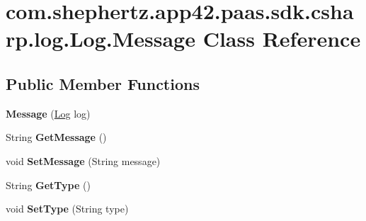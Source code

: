 \hypertarget{classcom_1_1shephertz_1_1app42_1_1paas_1_1sdk_1_1csharp_1_1log_1_1_log_1_1_message}{\section{com.\+shephertz.\+app42.\+paas.\+sdk.\+csharp.\+log.\+Log.\+Message Class Reference}
\label{classcom_1_1shephertz_1_1app42_1_1paas_1_1sdk_1_1csharp_1_1log_1_1_log_1_1_message}
}
\subsection*{Public Member Functions}
\begin{DoxyCompactItemize}
\item 
\hypertarget{classcom_1_1shephertz_1_1app42_1_1paas_1_1sdk_1_1csharp_1_1log_1_1_log_1_1_message_a18cac8c6a770816532cff3ddea549287}{{\bfseries Message} (\hyperlink{classcom_1_1shephertz_1_1app42_1_1paas_1_1sdk_1_1csharp_1_1log_1_1_log}{Log} log)}\label{classcom_1_1shephertz_1_1app42_1_1paas_1_1sdk_1_1csharp_1_1log_1_1_log_1_1_message_a18cac8c6a770816532cff3ddea549287}

\item 
\hypertarget{classcom_1_1shephertz_1_1app42_1_1paas_1_1sdk_1_1csharp_1_1log_1_1_log_1_1_message_ac7ab6b3457d83b273cadf0ca842378fc}{String {\bfseries Get\+Message} ()}\label{classcom_1_1shephertz_1_1app42_1_1paas_1_1sdk_1_1csharp_1_1log_1_1_log_1_1_message_ac7ab6b3457d83b273cadf0ca842378fc}

\item 
\hypertarget{classcom_1_1shephertz_1_1app42_1_1paas_1_1sdk_1_1csharp_1_1log_1_1_log_1_1_message_abe6fde235782a34c62f3e8b68cebedba}{void {\bfseries Set\+Message} (String message)}\label{classcom_1_1shephertz_1_1app42_1_1paas_1_1sdk_1_1csharp_1_1log_1_1_log_1_1_message_abe6fde235782a34c62f3e8b68cebedba}

\item 
\hypertarget{classcom_1_1shephertz_1_1app42_1_1paas_1_1sdk_1_1csharp_1_1log_1_1_log_1_1_message_a7b8d449f862ded1d7d299e21e5557657}{String {\bfseries Get\+Type} ()}\label{classcom_1_1shephertz_1_1app42_1_1paas_1_1sdk_1_1csharp_1_1log_1_1_log_1_1_message_a7b8d449f862ded1d7d299e21e5557657}

\item 
\hypertarget{classcom_1_1shephertz_1_1app42_1_1paas_1_1sdk_1_1csharp_1_1log_1_1_log_1_1_message_ac6c62953c5f4561a3a7195be91394737}{void {\bfseries Set\+Type} (String type)}\label{classcom_1_1shephertz_1_1app42_1_1paas_1_1sdk_1_1csharp_1_1log_1_1_log_1_1_message_ac6c62953c5f4561a3a7195be91394737}


\end{DoxyCompactItemize}
